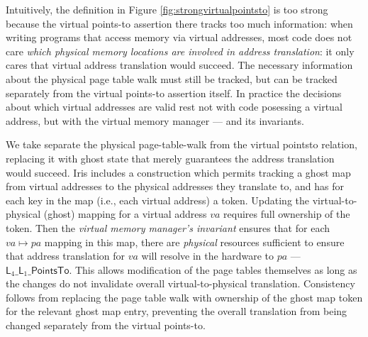   Intuitively, the definition in Figure \ref{fig:strongvirtualpointsto} is too strong because the virtual points-to
  assertion there tracks too much information: when writing programs that access memory via virtual addresses,
  most code does not care \emph{which physical memory locations are involved in address translation}: it only cares
  that virtual address translation would succeed. The necessary information about the physical page table walk
  must still be tracked, but can be tracked separately from the virtual points-to assertion itself.
  In practice the decisions about which virtual addresses are valid rest not with code posessing a virtual address, but with
  the virtual memory manager --- and its invariants.

  We take separate the physical page-table-walk  
  from the virtual pointsto relation, replacing it with ghost state that merely guarantees the address translation would succeed.
  Iris includes a construction which permits tracking a ghost map 
  from virtual addresses to the physical addresses they translate to, and has for each key in the map (i.e.,
  each virtual address) a token. Updating the virtual-to-physical (ghost) mapping for a virtual address $va$
  requires full ownership of the token. Then the \emph{virtual memory manager's invariant} ensures that for each $va\mapsto pa$ mapping
  in this map, there are \emph{physical} resources sufficient to ensure that address translation for $va$
  will resolve in the hardware to $pa$ --- $\textsf{L}_{4}\_\textsf{L}_{1}\_\textsf{PointsTo}$.
  This allows modification of the page tables themselves as long as the changes do not invalidate overall virtual-to-physical
  translation.
  Consistency follows from replacing the page table walk with ownership of the ghost map token for the relevant ghost map
  entry, preventing the overall translation from being changed separately from the virtual points-to.


